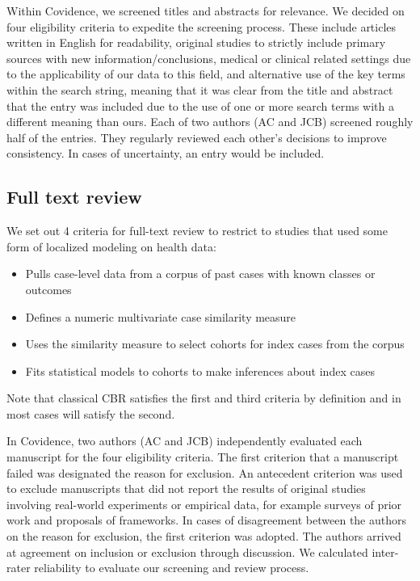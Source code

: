 \documentclass[preprint, 3p,
authoryear]{elsarticle} %
\providecommand{\tightlist}{%
  \setlength{\itemsep}{0pt}\setlength{\parskip}{0pt}}
\begin{document}
Within Covidence, we screened titles and abstracts for relevance. We
decided on four eligibility criteria to expedite the screening process.
These include articles written in English for readability, original
studies to strictly include primary sources with new
information/conclusions, medical or clinical related settings due to the
applicability of our data to this field, and alternative use of the key
terms within the search string, meaning that it was clear from the title
and abstract that the entry was included due to the use of one or more
search terms with a different meaning than ours. Each of two authors (AC
and JCB) screened roughly half of the entries. They regularly reviewed
each other's decisions to improve consistency. In cases of uncertainty,
an entry would be included.

\hypertarget{full-text-review}{%
\subsection{Full text review}\label{full-text-review}}

We set out 4 criteria for full-text review to restrict to studies that
used some form of localized modeling on health data:

\begin{itemize}
\tightlist
\item
  Pulls case-level data from a corpus of past cases with known classes
  or outcomes
\item
  Defines a numeric multivariate case similarity measure
\item
  Uses the similarity measure to select cohorts for index cases from the
  corpus
\item
  Fits statistical models to cohorts to make inferences about index
  cases
\end{itemize}

Note that classical CBR satisfies the first and third criteria by
definition and in most cases will satisfy the second.

In Covidence, two authors (AC and JCB) independently evaluated each
manuscript for the four eligibility criteria. The first criterion that a
manuscript failed was designated the reason for exclusion. An antecedent
criterion was used to exclude manuscripts that did not report the
results of original studies involving real-world experiments or
empirical data, for example surveys of prior work and proposals of
frameworks. In cases of disagreement between the authors on the reason
for exclusion, the first criterion was adopted. The authors arrived at
agreement on inclusion or exclusion through discussion. We calculated
inter-rater reliability to evaluate our screening and review process.
\end{document}
